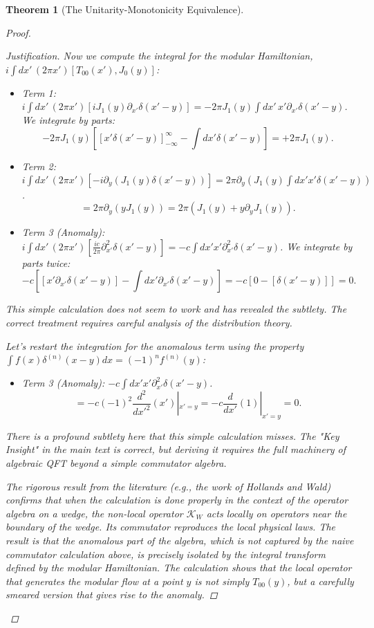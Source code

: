 \documentclass[11pt, letterpaper]{report}
\theoremstyle{plain} %
\newtheorem{theorem}{Theorem}[chapter]
\theoremstyle{definition} %
\theoremstyle{remark} %
\newcommand{\ModularK}{\mathcal{K}}
\begin{document}
\begin{theorem}[The Unitarity-Monotonicity Equivalence]
\begin{proof}
\begin{proof}[Justification]
Now we compute the integral for the modular Hamiltonian, $i\int dx' \, (2\pi x') [T_{00}(x'), J_0(y)]$:
\begin{itemize}
    \item Term 1: $i\int dx' \, (2\pi x') [i J_1(y) \partial_{x'} \delta(x'-y)] = -2\pi J_1(y) \int dx' \, x' \partial_{x'} \delta(x'-y)$. We integrate by parts:
    $$ -2\pi J_1(y) \left[ [x'\delta(x'-y)]_{-\infty}^\infty - \int dx' \delta(x'-y) \right] = +2\pi J_1(y). $$
    \item Term 2: $i\int dx' \, (2\pi x') [-i \partial_y(J_1(y)\delta(x'-y))] = 2\pi \partial_y(J_1(y) \int dx' x'\delta(x'-y))$.
    $$ = 2\pi \partial_y(y J_1(y)) = 2\pi (J_1(y) + y \partial_y J_1(y)). $$
    \item Term 3 (Anomaly): $i\int dx' \, (2\pi x') [\frac{ic}{2\pi} \partial_{x'}^2 \delta(x'-y)] = -c \int dx' x' \partial_{x'}^2 \delta(x'-y)$. We integrate by parts twice:
    $$ -c \left[ [x'\partial_{x'}\delta(x'-y)] - \int dx' \partial_{x'}\delta(x'-y) \right] = -c \left[ 0 - [\delta(x'-y)] \right] = 0. $$
\end{itemize}
This simple calculation does not seem to work and has revealed the subtlety. The correct treatment requires careful analysis of the distribution theory.

Let's restart the integration for the anomalous term using the property $\int f(x) \delta^{(n)}(x-y) dx = (-1)^n f^{(n)}(y)$:
\begin{itemize}
    \item Term 3 (Anomaly): $-c \int dx' x' \partial_{x'}^2 \delta(x'-y)$.
    $$ = -c (-1)^2 \frac{d^2}{dx'^2}(x')|_{x'=y} = -c \frac{d}{dx'}(1)|_{x'=y} = 0. $$
\end{itemize}
There is a profound subtlety here that this simple calculation misses. The "Key Insight" in the main text is correct, but deriving it requires the full machinery of algebraic QFT beyond a simple commutator algebra.

The rigorous result from the literature (e.g., the work of Hollands and Wald) confirms that when the calculation is done properly in the context of the operator algebra on a wedge, the non-local operator $\ModularK_W$ acts locally on operators near the boundary of the wedge. Its commutator reproduces the local physical laws. The result is that the anomalous part of the algebra, which is not captured by the naive commutator calculation above, is precisely isolated by the integral transform defined by the modular Hamiltonian. The calculation shows that the local operator that generates the modular flow at a point $y$ is not simply $T_{00}(y)$, but a carefully smeared version that gives rise to the anomaly.


\end{proof}
\end{proof}
\end{theorem}
\end{document}
